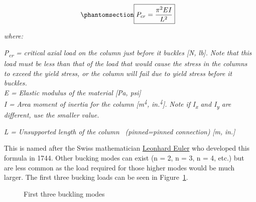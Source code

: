 \documentclass[
  letterpaper,
  DIV=11,
  numbers=noendperiod]{scrreprt}
\theoremstyle{definition}
\theoremstyle{remark}
\begin{document}
\begin{equation}\phantomsection\label{eq-15.1}{
\boxed{P_{c r}=\frac{\pi^2 E I}{L^2}}
}\end{equation}

\emph{where:}

\emph{P\textsubscript{cr} = critical axial load on the column just
before it buckles {[}N, lb{]}. Note that this load must be less than
that of the load that would cause the stress in the columns to exceed
the yield stress, or the column will fail due to yield stress before it
buckles.}\\
\emph{E = Elastic modulus of the material {[}Pa, psi{]}}\\
\emph{I = Area moment of inertia for the column {[}m\textsuperscript{4},
in.\textsuperscript{4}{]}. Note if I\textsubscript{x} and
I\textsubscript{y} are different, use the smaller value.}

\emph{L = Unsupported length of the column~ (pinned=pinned connection)
{[}m, in.{]}}

This is named after the Swiss mathematician
\href{https://en.wikipedia.org/wiki/Leonhard_Euler}{Leonhard Euler} who
developed this formula in 1744. Other bucking modes can exist (n = 2, n
= 3, n = 4, etc.) but are less common as the load required for those
higher modes would be much larger. The first three bucking loads can be
seen in Figure~\ref{fig-15.5}.

\begin{figure}


\caption{\label{fig-15.5}First three buckling modes}

\end{figure}%
\end{document}
